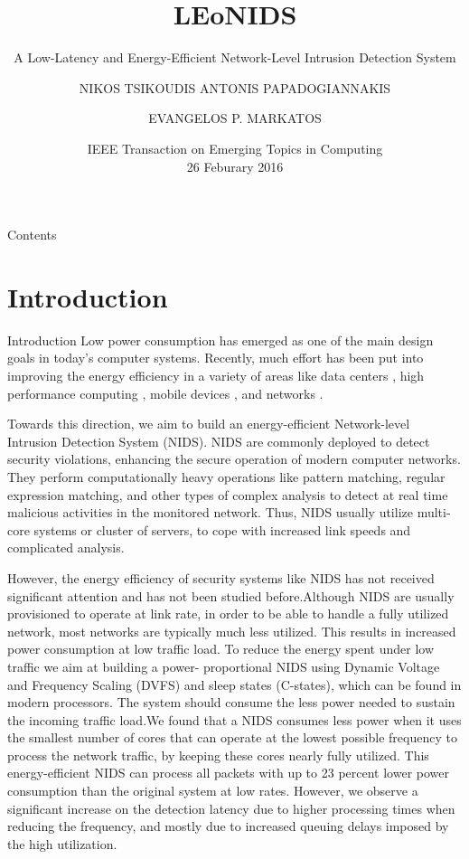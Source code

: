\documentclass{beamer}
\title{LEoNIDS}
\subtitle{A Low-Latency and Energy-Efficient Network-Level Intrusion Detection System}
\author{NIKOS TSIKOUDIS \inst{1} ANTONIS PAPADOGIANNAKIS \inst{2} \and EVANGELOS P. MARKATOS \inst{2}}
\institute[NIT-KKR]{%
  \inst{1}
        Brandeis University, Waltham, MA 02453, USA
  \and \inst{2}
    Institute of Computer Science,Foundation for Research and Technology-Hellas, Heraklion 700 13, Greece
}
\date{IEEE Transaction on Emerging Topics in Computing \\ 26 Feburary 2016}
\begin{document}
\begin{frame}
  \titlepage
\end{frame}

\begin{frame}[allowframebreaks]{Contents}
    \tableofcontents[sections=1-4]
    \framebreak
    \tableofcontents[sections=5-10]
\end{frame}

\section{Introduction} 

\begin{frame}[allowframebreaks]{Introduction}
Low power consumption has emerged as one of the main
design goals in today's computer systems. Recently, much
effort has been put into improving the energy efficiency in
a variety of areas like data centers , high performance
computing , mobile devices , and networks .

Towards this direction, we aim to build an energy-efficient
Network-level Intrusion Detection System (NIDS). NIDS are
commonly deployed to detect security violations, enhancing
the secure operation of modern computer networks. They
perform computationally heavy operations like pattern
matching, regular expression matching, and other types of
complex analysis to detect at real time malicious activities in
the monitored network. Thus, NIDS usually utilize multi-core
systems or cluster of servers, to cope with increased
link speeds and complicated analysis.

\framebreak
However, the energy efficiency of security systems like NIDS has not received significant attention and has not been studied before.Although NIDS are usually provisioned to operate at link
rate, in order to be able to handle a fully utilized network,
most networks are typically much less utilized. This results
in increased power consumption at low traffic load. To reduce
the energy spent under low traffic we aim at building a power-
proportional NIDS using Dynamic Voltage and Frequency
Scaling (DVFS) and sleep states (C-states), which can be
found in modern processors. The system should consume
the less power needed to sustain the incoming traffic load.We found that a NIDS consumes less power when it uses the smallest number of cores that can operate at the lowest
possible frequency to process the network traffic, by keeping
these cores nearly fully utilized. This energy-efficient NIDS
can process all packets with up to 23 percent lower power
consumption than the original system at low rates. However,
we observe a significant increase on the detection latency due
to higher processing times when reducing the frequency, and
mostly due to increased queuing delays imposed by the high
utilization.


\end{frame}
\end{document}
